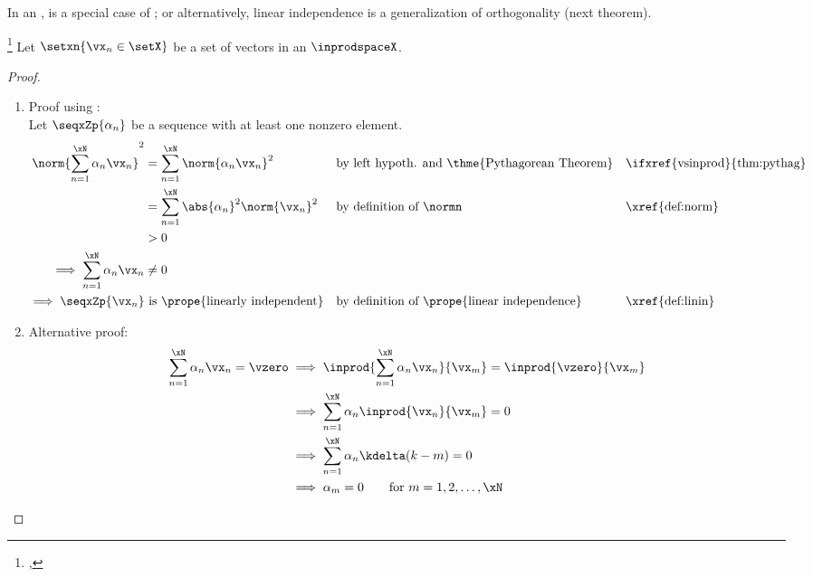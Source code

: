 In an ,  is a special case of ;
or alternatively, linear independence is a generalization of orthogonality (next theorem).
\begin{theorem}
\footnote{
  ,
  }
\label{thm:orthog==>linin}
Let $\setxn{\vx_n\in\setX}$ be a set of vectors in an 
 $\inprodspaceX$.
\end{theorem}
\begin{proof}
\begin{enumerate}
  \item Proof using :
    \\Let $\seqxZp{\alpha_n}$ be a sequence with at least one nonzero element.
    \\\begin{align*}
        \norm{\sum_{n=1}^\xN \alpha_{n} \vx_n}^2
          &= \sum_{n=1}^\xN \norm{\alpha_{n} \vx_n}^2
          && \text{by left hypoth. and \thme{Pythagorean Theorem}}
          && \text{\ifxref{vsinprod}{thm:pythag}}
        \\&= \sum_{n=1}^\xN \abs{\alpha_n}^2\norm{\vx_n}^2
          && \text{by definition of $\normn$}
          && \text{\xref{def:norm}}
        \\&> 0
        \\\implies \sum_{n=1}^\xN \alpha_{n} \vx_{n} &\neq 0
        \\\implies \seqxZp{\vx_n} &\text{ is \prope{linearly independent}}
          && \text{by definition of \prope{linear independence}}
          && \text{\xref{def:linin}}
      \end{align*}

  \item Alternative proof:
    \begin{align*}
      \sum_{n=1}^\xN \alpha_n\vx_{n} = \vzero
        &\implies  \inprod{\sum_{n=1}^\xN \alpha_n\vx_n}{\vx_m} = \inprod{\vzero}{\vx_m}
      \\&\implies  \sum_{n=1}^\xN \alpha_n\inprod{\vx_n}{\vx_m} = 0
      \\&\implies  \sum_{n=1}^\xN \alpha_n\kdelta(k-m) = 0
      \\&\implies  \alpha_m = 0 \qquad \text{for $m=1,2,\ldots,\xN$}
    \end{align*}

\end{enumerate}
\end{proof}


